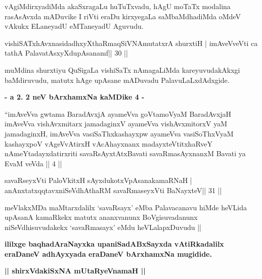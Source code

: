 \begin{artha}
vAgiMdirxyadiMda akaSxragaLu huTuTxvadu, hAgU moTaTx modalina rasAsAvxda mADuvike I riVti eraDu kirxyegaLa saMbaMdhadiMda oMdeV vAkukx ELaneyadU eMTaneyadU Aguvudu.
\end{artha}


\begin{shl}
vishiSATxhAvxnasidadhxyXthaRmaqSiVNAmutatxrA shurxtiH |
imAveVveVti ca tathA PalavatAsxyXdupAsanamf\hfill || 30 ||
\end{shl}

\begin{artha}
muMdina shurxtiyu QuSigaLa vishiSaTx nAmagaLiMda kareyuvudakAkxgi
baMdiruvudu, matutx hAge upAsane mADuvadu PalavuLaLxdAdxgide.
\end{artha}


{\centerline{\textbf{- a 2. 2 neV bArxhamxNa kaMDike 4 -}}}
\medskip

\begin{shl}
``imAveVva gwtama BaradAvxjA ayameVva goVtamoV\s yaM BaradAvxjaH
  imAveVva vishAvxmitarx jamadaginxV ayameVva vishAvxmitorxV\s
  yaM jamadaginxH, imAveVva vasiSaThxkashayxpw ayameVva vasiSoThxV\s yaM
  kashayxpoV vAgeVvAtirxH vAcAhayxnanx madayxteV\s titxhaRveY
  nAmeYtadayxdatirxriti savaRsAyxtAtxBavati savaRmasAyxnanxM Bavati
  ya EvaM veVda || 4 ||
\end{shl}

\begin{shl}
savaRseyxVti PaloVkitxH sAyxdukotxVpAsanakamaRNaH |
anAnxtatxqqtavxniSeVdhAthaRM savaRmaseyxVti BaNayxteV\hfill || 31 ||
\end{shl}

\begin{artha}
meVlakxMDa maMtarxdalilx `savaRsayx' eMba Palavacanavu hiMde heVLida
upAsanA kamaRkekx matutx ananxvanunx BoVgisuvadanunx niSeVdhisuvudakekx
`savaRmasayx' eMdu heVLalapxDuvudu || 
\end{artha}

\begin{center}
{\textbf{ililxge baqhadAraNayxka upaniSadABxSayxda vAtiRkadalilx 
eraDaneV adhAyxyada eraDaneV bArxhamxNa mugidide.}}
\end{center}

\medskip
\begin{center}
{\large{\textbf{|| shirxVdakiSxNA mUtaRyeVnamaH ||}}}
\end{center}

